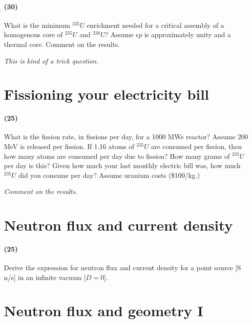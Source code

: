 \documentclass[11pt,a4paper]{article}
\begin{document}
\paragraph*{(30)}
What is the minimum $^{235}U$ enrichment needed for a critical assembly of a homogenous core of $^{235}U$ and $^{238}U$? Assume $\epsilon p$ is approximately unity and a thermal core. Comment on the results. 

\vspace{\baselineskip}

\noindent\textit{This is kind of a trick question.}





\newpage

\section{Fissioning your electricity bill}
\paragraph*{(25)}
What is the fission rate, in fissions per day, for a 1000 MWe reactor? Assume 200 MeV is released per fission. If 1.16 atoms of $^{235}U$ are consumed per fission, then how many atoms are consumed per day due to fission? How many grams of $^{235}U$ per day is this? Given how much your last monthly electric bill was, how much $^{235}U$ did you consume per day?  Assume uranium costs (\$100/kg.) 

\vspace{\baselineskip}

\noindent\textit{Comment on the results.}





\newpage

\section{Neutron flux and current density}
\paragraph*{(25)}
Derive the expression for neutron flux and current density for a point source [S n/s] in an infinite vacuum [$D = 0$].





\newpage

\section{Neutron flux and geometry I}
\end{document}
